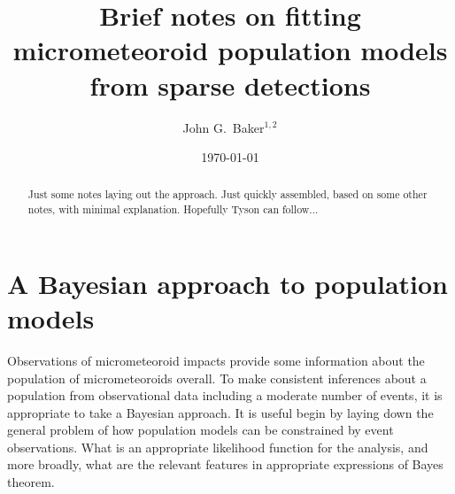 \documentclass[twocolumn,showpacs,aps,prd,nobibnotes,nofootinbib,floatfix]{revtex4-1}
\begin{document}
\date{\today}
\title{Brief notes on fitting micrometeoroid population models from sparse detections}
\author{John G.~Baker$^{1,2}$}

\begin{abstract}
  Just some notes laying out the approach.  Just quickly assembled, based on some other notes, with minimal explanation.  Hopefully Tyson can follow...
\end{abstract}
\maketitle
\section{A Bayesian approach to population models}
Observations of micrometeoroid impacts provide some information about the population of micrometeoroids overall.  To make consistent inferences about a population from observational data including a moderate number of events, it is appropriate to take a Bayesian approach.  It is useful begin by laying down the general problem of how population models can be constrained by event observations. What is an appropriate likelihood function for the analysis, and more broadly, what are the relevant features in appropriate expressions of Bayes theorem.  
\end{document}
